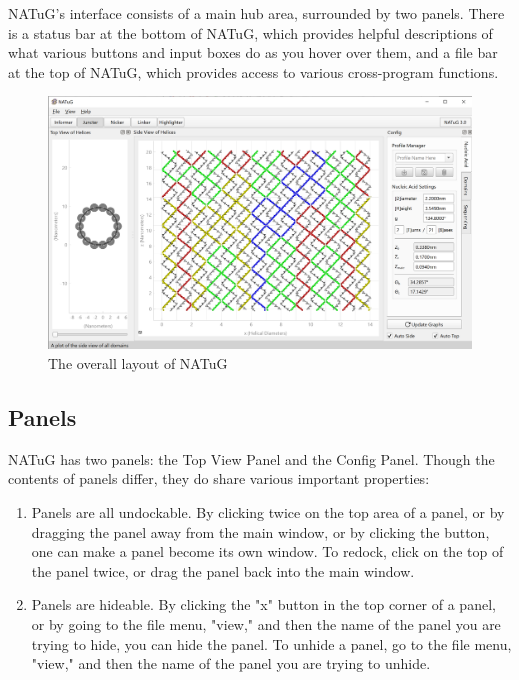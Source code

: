 \documentclass[titlepage]{article}
\begin{document}
	NATuG’s interface consists of a main hub area, surrounded by two panels. There is a status bar at the bottom of NATuG, which provides helpful descriptions of what various buttons and input boxes do as you hover over them, and a file bar at the top of NATuG, which provides access to various cross-program functions.
	
	\begin{figure}[h]
		\centering
		\caption{The overall layout of NATuG}
		\label{program-layout}
		\includegraphics[width=5in]{program-layout.png}
	\end{figure}

	\subsection{Panels} \label{sect:panels}
	NATuG has two panels: the Top View Panel and the Config Panel. Though the contents of panels differ, they do share various important properties:
	
	\begin{enumerate}
		\item Panels are all undockable. By clicking twice on the top area of a panel, or by dragging the panel away from the main window, or by clicking the  button, one can make a panel become its own window. To redock, click on the top of the panel twice, or drag the panel back into the main window. 
		\item Panels are hideable. By clicking the "x" button in the top corner of a panel, or by going to the file menu, "view," and then the name of the panel you are trying to hide, you can hide the panel. To unhide a panel, go to the file menu, "view," and then the name of the panel you are trying to unhide. 
	\end{enumerate}
\end{document}
